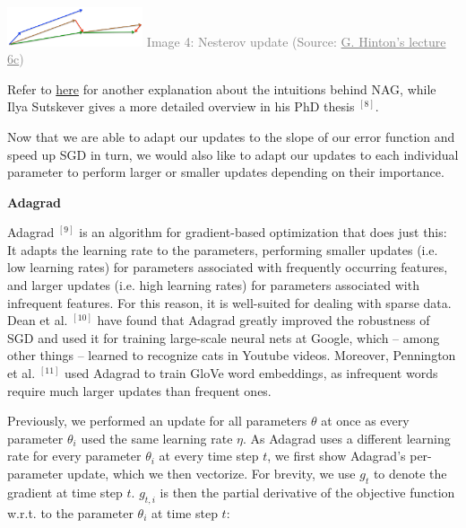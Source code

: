 \documentclass[4pt,journal,compsoc]{IEEEtran}
\begin{document}
\begin{flushleft}
    \begin{center}
        \includegraphics[width = 4cm]{P005.PNG} \newline
        \textcolor{gray}{Image 4: Nesterov update (Source:  \underline{G. Hinton's lecture 6c})} \newline
    \end{center}
    
    Refer to \underline{here} for another explanation about the intuitions behind NAG, while Ilya Sutskever gives a more detailed overview in his PhD thesis $^ {[8]}$. \newline

    Now that we are able to adapt our updates to the slope of our error function and speed up SGD in turn, we would also like to adapt our updates to each individual parameter to perform larger or smaller updates depending on their importance. \newline \newline
    
    \textbf{\Large Adagrad} \newline

    Adagrad $^ {[9]}$ is an algorithm for gradient-based optimization that does just this: It adapts the learning rate to the parameters, performing smaller updates (i.e. low learning rates) for parameters associated with frequently occurring features, and larger updates (i.e. high learning rates) for parameters associated with infrequent features. For this reason, it is well-suited for dealing with sparse data. Dean et al. $^ {[10]}$ have found that Adagrad greatly improved the robustness of SGD and used it for training large-scale neural nets at Google, which -- among other things -- learned to recognize cats in Youtube videos. Moreover, Pennington et al. $^ {[11]}$ used Adagrad to train GloVe word embeddings, as infrequent words require much larger updates than frequent ones. \newline
    
    Previously, we performed an update for all parameters $\theta$ at once as every parameter $\theta_i$ used the same learning rate $\eta$. As Adagrad uses a different learning rate for every parameter $\theta_i$ at every time step $t$, we first show Adagrad's per-parameter update, which we then vectorize. For brevity, we use $g_t$ to denote the gradient at time step $t$. $g_{t, i}$ is then the partial derivative of the objective function w.r.t. to the parameter $\theta_i$ at time step $t$: \newline
    

\end{flushleft}
\end{document}
